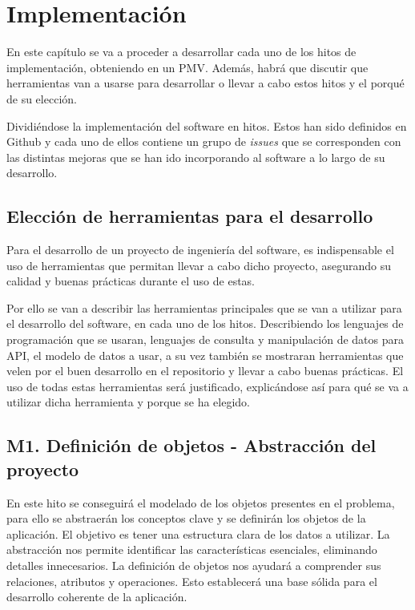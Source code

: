 \chapter{Implementación}

En este capítulo se va a proceder a desarrollar cada uno de los hitos de implementación, obteniendo en un PMV. Además, habrá que discutir que herramientas van a usarse para desarrollar o llevar a cabo estos hitos y el porqué de su elección. 

Dividiéndose la implementación del software en hitos. Estos han sido definidos en Github
y cada uno de ellos contiene un grupo de \textit{issues} que se corresponden con las distintas
mejoras que se han ido incorporando al software a lo largo de su desarrollo.\\

\section{Elección de herramientas para el desarrollo}

Para el desarrollo de un proyecto de ingeniería del software, es indispensable el uso de herramientas 
que permitan llevar a cabo dicho proyecto, asegurando su calidad y buenas prácticas durante el uso de 
estas.

Por ello se van a describir las herramientas principales que se van a utilizar para el desarrollo del 
software, en cada uno de los hitos. Describiendo los lenguajes de programación que se usaran, lenguajes 
de consulta y manipulación de datos para API, el modelo de datos a usar, a su vez también se mostraran 
herramientas que velen por el buen desarrollo en el repositorio y llevar a cabo buenas prácticas. El 
uso de todas estas herramientas será justificado, explicándose así para qué se va a utilizar dicha 
herramienta y porque se ha elegido.

\section{M1. Definición de objetos - Abstracción del proyecto}

En este hito se conseguirá el modelado de los objetos presentes en el problema, para ello se abstraerán 
los conceptos clave y se definirán los objetos de la aplicación. El objetivo es tener una estructura 
clara de los datos a utilizar. La abstracción nos permite identificar las características esenciales, 
eliminando detalles innecesarios. La definición de objetos nos ayudará a comprender sus relaciones, 
atributos y operaciones. Esto establecerá una base sólida para el desarrollo coherente de la aplicación.

